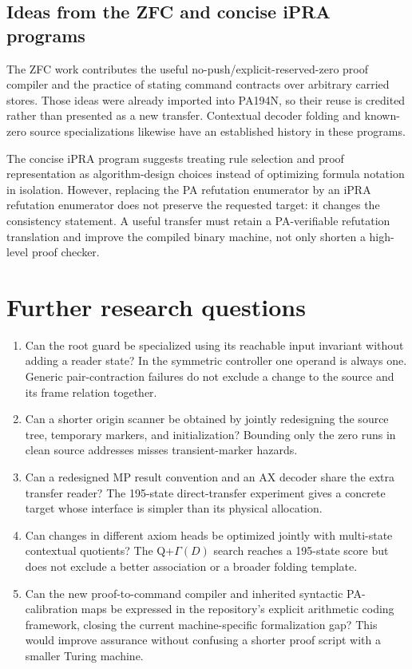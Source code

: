 \documentclass[11pt,letterpaper]{article}
\begin{document}
\subsection{Ideas from the ZFC and concise iPRA programs}

The ZFC work contributes the useful no-push/explicit-reserved-zero proof
compiler and the practice of stating command contracts over arbitrary
carried stores. Those ideas were already imported into PA194N, so their
reuse is credited rather than presented as a new transfer. Contextual
decoder folding and known-zero source specializations likewise have an
established history in these programs.

The concise iPRA program suggests treating rule selection and proof
representation as algorithm-design choices instead of optimizing formula
notation in isolation. However, replacing the PA refutation enumerator
by an iPRA refutation enumerator does not preserve the requested target:
it changes the consistency statement. A useful transfer must retain a
PA-verifiable refutation translation and improve the compiled binary
machine, not only shorten a high-level proof checker.

\section{Further research questions}

\begin{enumerate}
\item Can the root guard be specialized using its reachable input invariant
without adding a reader state? In the symmetric controller one operand is
always one. Generic pair-contraction failures do not exclude a change to
the source and its frame relation together.
\item Can a shorter origin scanner be obtained by jointly redesigning the
source tree, temporary markers, and initialization? Bounding only the
zero runs in clean source addresses misses transient-marker hazards.
\item Can a redesigned MP result convention and an AX decoder share the
extra transfer reader? The 195-state direct-transfer experiment gives a
concrete target whose interface is simpler than its physical allocation.
\item Can changes in different axiom heads be optimized jointly with
multi-state contextual quotients? The Q+$\Gamma(D)$ search reaches a
195-state score but does not exclude a better association or a broader
folding template.
\item Can the new proof-to-command compiler and inherited syntactic
PA-calibration maps be expressed in the repository's explicit arithmetic
coding framework, closing the current machine-specific formalization gap?
This would improve assurance without confusing a shorter proof script
with a smaller Turing machine.
\end{enumerate}
\end{document}
